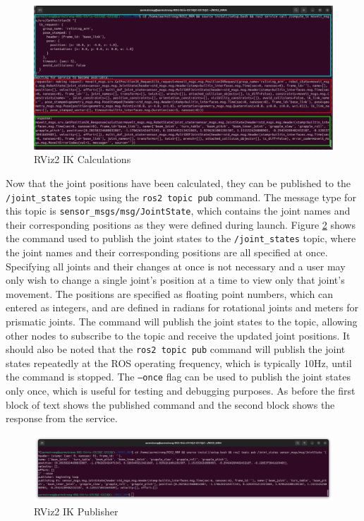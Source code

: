 \documentclass[10pt,a4paper,english]{article}
\begin{document}
\begin{figure}[ht]
    \centering
    \includegraphics[width=1.0\textwidth]{IK_Calcs_Coloured.png}
    \caption{RViz2 IK Calculations}
    \label{fig:rviz2_ik_calculations}
\end{figure} \newpage

Now that the joint positions have been calculated, they can be published to the \texttt{/joint\_states} topic using the \texttt{ros2 topic pub} command. The message type for this topic is \texttt{sensor\_msgs/msg/JointState}, which contains the joint names and their corresponding positions as they were defined during launch. Figure \ref{fig:rviz2_ik_publisher} shows the command used to publish the joint states to the \texttt{/joint\_states} topic, where the joint names and their corresponding positions are all specified at once. Specifying all joints and their changes at once is not necessary and a user may only wish to change a single joint's position at a time to view only that joint's movement. The positions are specified as floating point numbers, which can entered as integers, and are defined in radians for rotational joints and meters for prismatic joints. The command will publish the joint states to the topic, allowing other nodes to subscribe to the topic and receive the updated joint positions. It should also be noted that the \texttt{ros2 topic pub} command will publish the joint states repeatedly at the ROS operating frequency, which is typically 10Hz, until the command is stopped. The \texttt{--once} flag can be used to publish the joint states only once, which is useful for testing and debugging purposes. As before the first block of text shows the published command and the second block shows the response from the service.

\begin{figure}[ht]
    \centering
    \includegraphics[width=1.0\textwidth]{IK_Publisher.png}
    \caption{RViz2 IK Publisher}
    \label{fig:rviz2_ik_publisher}
\end{figure}
\end{document}
